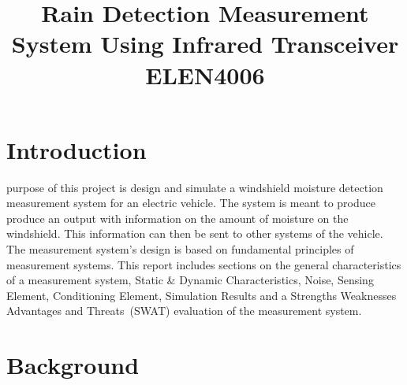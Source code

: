 \documentclass[conference, 11pt]{IEEEtran}
\begin{document}
\title{Rain Detection Measurement System Using Infrared Transceiver\\
{\footnotesize \textsuperscript{}ELEN4006}
}

\author{
\and
{}
}

\maketitle

\begin{abstract}

\end{abstract}

\begin{IEEEkeywords}

\end{IEEEkeywords}

\section{Introduction}
 purpose of this project is design and simulate a windshield moisture detection measurement system for an electric vehicle. The system is meant to produce produce an output with information on the amount of moisture on the windshield. This information can then be sent to other systems of the vehicle. The measurement system's design is based on fundamental principles of measurement systems. This report includes sections on the general characteristics of a measurement system, Static \& Dynamic Characteristics, Noise, Sensing Element, Conditioning Element, Simulation Results and a Strengths Weaknesses Advantages and Threats~(SWAT) evaluation of the measurement system.

\section{Background}
	
\end{document}
